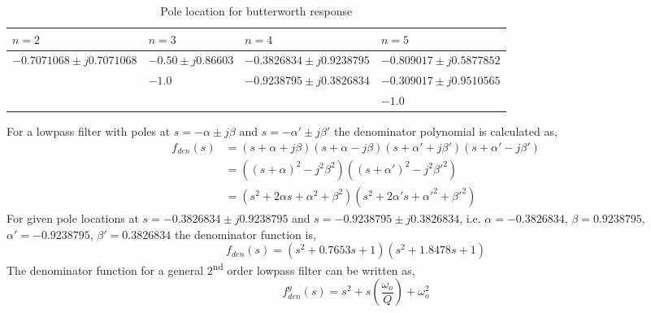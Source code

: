 \documentclass{lab_sheet}
\begin{document}
    \begin{table}[H]
        \centering
        \begin{tabular}{|M{3cm}|M{3cm}|M{3cm}|M{3cm}|}
            \hline
            $n=2$ & $n=3$ & $n=4$ & $n=5$ \\
            \hline \hline
           $-0.7071068\pm j0.7071068$     & $-0.50\pm j 0.86603$ & $-0.3826834\pm j0.9238795$  & $-0.809017\pm j 0.5877852$  \\
           \hline
            ~       & $-1.0$  & $-0.9238795\pm j0.3826834$  & $-0.309017\pm j0.9510565$    \\
            \hline
            ~       & ~       & ~       & $-1.0$    \\
            \hline
            \end{tabular}
            \caption{Pole location for butterworth response}
            \label{tbl:pole_location}
    \end{table}
For a lowpass filter with poles at $s=-\alpha\pm j\beta$ and $s=-\alpha'\pm j\beta'$ the denominator polynomial is calculated as,
\begin{equation*}
    \begin{aligned}
        f_{den}(s)&=(s+\alpha+j\beta)(s+\alpha-j\beta)(s+\alpha'+j\beta')(s+\alpha'-j\beta') \\
        &=\left((s+\alpha)^2-j^2\beta^2\right)\left((s+\alpha')^2-j^2\beta'^2\right) \\
        &=\left(s^2+2\alpha s +\alpha^2+\beta^2\right)\left(s^2+2\alpha' s +\alpha'^2+\beta'^2\right)
    \end{aligned}
\end{equation*}
For given pole locations at $s=-0.3826834\pm j0.9238795$ and $s=-0.9238795\pm j0.3826834$, i.e. $\alpha=-0.3826834$, $\beta=0.9238795$, $\alpha'=-0.9238795$, $\beta'=0.3826834$ the denominator function is,
\begin{equation}
        f_{den}(s)=(s^2+0.7653s+1)(s^2+1.8478s+1)
        \label{eqn:den-derived}
 \end{equation}
 The denominator function for a general 2\textsuperscript{nd} order lowpass filter can be written as,
 \begin{equation}
     f_{den}^{g}(s)=s^2+s\left(\frac{\omega_o}{Q}\right)+\omega_o^2
     \label{eqn:den-general}
 \end{equation}
\end{document}
